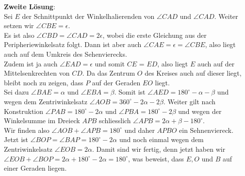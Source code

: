 \documentclass[12pt,a4paper]{article}
\theoremstyle{plain}
\theoremstyle{definition}
\theoremstyle{remark}
\begin{document}
\begin{enumerate}
\textbf{Zweite Lösung}:\\
Sei $E$ der Schnittpunkt der Winkelhalierenden von $\angle CAD$ und $\angle CAD$. Weiter setzen wir $\angle CBE = \epsilon$.\\
Es ist also $\angle CBD = \angle CAD = 2\epsilon$, wobei die erste Gleichung aus der Peripheriewinkelsatz folgt. Dann ist aber
auch $\angle CAE = \epsilon = \angle CBE$, also liegt auch auf dem Umkreis des Sehenvierecks. \\Zudem ist ja auch $\angle EAD = 
\epsilon$ und somit $CE$ = $ED$, also liegt $E$ auch auf der Mittelsenkrechten von $CD$. Da das Zentrum $O$ des Kreises auch auf
dieser liegt, bleibt noch zu zeigen, dass $P$ auf der Geraden $EO$ liegt.\\
Sei dazu $\angle BAE = \alpha$ und $\angle EBA = \beta$. Somit ist $\angle AED = 180^{\circ} - \alpha - \beta$ und wegen
dem Zentriwinkelsatz $\angle AOB = 360^{\circ} - 2\alpha - 2\beta$. Weiter gilt nach Konstruktion $\angle PAB = 180^{\circ} - 2\alpha$ und
$\angle PBA = 180^{\circ} - 2\beta$ und wegen der Winkelsumme im Dreieck $APB$ schliesslich $\angle APB = 2\alpha + \beta - 180^{\circ}$.\\
Wir finden also $\angle AOB + \angle APB = 180^{\circ}$ und daher $APBO$ ein Sehnenviereck. Jetzt ist $\angle BOP = \angle BAP = 180^{\circ} - 2\alpha$
und noch einmal wegen dem Zentriwinkelsatz $\angle EOB = 2\alpha$. Damit sind wir fertig, denn jetzt haben wir $\angle EOB +\angle
BOP = 2\alpha + 180^{\circ} - 2\alpha = 180^{\circ}$, was beweist, dass $E,O$ und $B$ auf einer Geraden liegen.\\


\end{enumerate}
\end{document}
